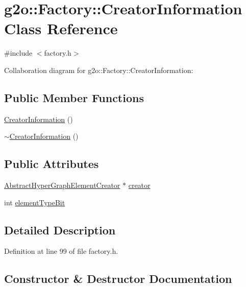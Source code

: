 \hypertarget{classg2o_1_1Factory_1_1CreatorInformation}{}\section{g2o\+:\+:Factory\+:\+:Creator\+Information Class Reference}
\label{classg2o_1_1Factory_1_1CreatorInformation}


{\ttfamily \#include $<$factory.\+h$>$}



Collaboration diagram for g2o\+:\+:Factory\+:\+:Creator\+Information\+:
\subsection*{Public Member Functions}
\begin{DoxyCompactItemize}
\item 
\hyperlink{classg2o_1_1Factory_1_1CreatorInformation_a8f4353b17f6548b0c935a4062231d968}{Creator\+Information} ()
\item 
\hyperlink{classg2o_1_1Factory_1_1CreatorInformation_a5f29790696c1143395a4e11f4bb372c1}{$\sim$\+Creator\+Information} ()
\end{DoxyCompactItemize}
\subsection*{Public Attributes}
\begin{DoxyCompactItemize}
\item 
\hyperlink{classg2o_1_1AbstractHyperGraphElementCreator}{Abstract\+Hyper\+Graph\+Element\+Creator} $\ast$ \hyperlink{classg2o_1_1Factory_1_1CreatorInformation_a9fd5a1087992c17f869f1d59bc519c23}{creator}
\item 
int \hyperlink{classg2o_1_1Factory_1_1CreatorInformation_ab9fa4c8aec27d204f5ae6a7510c4e339}{element\+Type\+Bit}
\end{DoxyCompactItemize}


\subsection{Detailed Description}


Definition at line 99 of file factory.\+h.



\subsection{Constructor \& Destructor Documentation}
